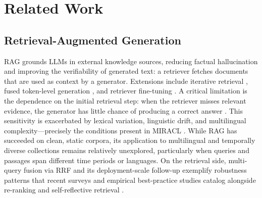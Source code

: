 \documentclass[11pt]{article}
\begin{document}
\section{Related Work}
\label{sec:related}

\subsection{Retrieval-Augmented Generation}
RAG \citep{lewis2020retrieval} grounds LLMs in external knowledge sources, reducing factual hallucination and improving the verifiability of generated text: a retriever fetches documents that are used as context by a generator. Extensions include iterative retrieval \citep{trivedi2023interleavingretrievalchainofthoughtreasoning}, fused token-level generation \citep{izacard2021leveragingpassageretrievalgenerative}, and retriever fine-tuning \citep{izacard2022atlasfewshotlearningretrieval}. A critical limitation is the dependence on the initial retrieval step: when the retriever misses relevant evidence, the generator has little chance of producing a correct answer \citep{vidgen2020directions}. This sensitivity is exacerbated by lexical variation, linguistic drift, and multilingual complexity---precisely the conditions present in MIRACL \citep{zhang2023miracl}. While RAG has succeeded on clean, static corpora, its application to multilingual and temporally diverse collections remains relatively unexplored, particularly when queries and passages span different time periods or languages. On the retrieval side, multi-query fusion via RRF \citep{rackauckas2024ragfusion} and its deployment-scale follow-up \citep{medrano2026ragfusion} exemplify robustness patterns that recent surveys and empirical best-practice studies catalog alongside re-ranking and self-reflective retrieval \citep{gao2023retrievalaugmented,wang2024searching,asai2024selfrag}.
\end{document}
